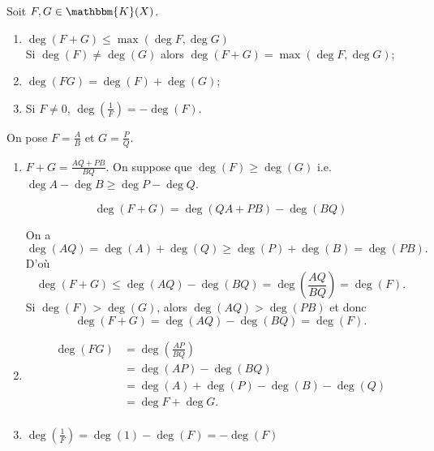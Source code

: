 \begin{prop}
	Soit $F, G \in \mathbbm{K}(X)$.
	\begin{enumerate}
		\item $\deg(F+G) \le \max(\deg F, \deg G)$\\
			Si $\deg(F) \neq \deg(G)$ alors $\deg(F+G) = \max(\deg F, \deg G)$;
		\item $\deg(FG) = \deg(F) + \deg(G)$;
		\item Si $F \neq 0$, $\deg\left( \frac{1}{F} \right) = -\deg(F)$.
	\end{enumerate}
\end{prop}

\begin{prv}
	On pose $F = \frac{A}{B}$ et $G = \frac{P}{Q}$.

	\begin{enumerate}
		\item $F+G = \frac{AQ+PB}{BQ}$. On suppose que $\deg(F) \ge \deg(G)$ i.e. $\deg A - \deg B \ge \deg P - \deg Q$.

			\[\deg(F+G) = \deg(QA+PB) - \deg(BQ)\]

			On a \[
				\deg(AQ) = \deg(A) + \deg(Q) \ge \deg(P) + \deg(B) = \deg(PB).
			\] D'où \[
				\deg(F+G) \le \deg(AQ) - \deg(BQ) = \deg\left( \frac{AQ}{BQ} \right) = \deg(F).
			\] Si $\deg(F) > \deg(G)$, alors $\deg(AQ) > \deg(PB)$ et donc \[
				\deg(F+G) = \deg(AQ) - \deg(BQ) = \deg(F).
			\]
		\item
			\begin{align*}
				\deg(FG) &= \deg\left( \frac{AP}{BQ} \right) \\
				&= \deg(AP) - \deg(BQ) \\
				&= \deg(A) + \deg(P) - \deg(B) - \deg(Q) \\
				&= \deg F + \deg G. \\
			\end{align*}
		\item $\deg\left( \frac{1}{F} \right) = \deg(1) - \deg(F) = -\deg(F)$
	\end{enumerate}
\end{prv}
